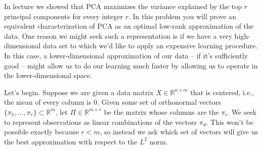 \documentclass{harvardml}
\newcommand{\R}{\mathbb{R}}
\theoremstyle{plain}
\begin{document}

\begin{problem}
In lecture we showed that PCA maximizes the variance explained by the top $r$ principal components for every integer $r$. In this problem you will prove an equivalent characterization of PCA as an optimal low-rank approximation of the data. One reason we might seek such a representation is if we have a very high-dimensional data set to which we'd like to apply an expensive learning procedure. In this case, a lower-dimensional approximation of our data \--- if it's sufficiently good \--- might allow us to do our learning much faster by allowing us to operate in the lower-dimensional space.

Let's begin. Suppose we are given a data matrix $X \in \R^{n \times m}$ that is centered, i.e., the mean of every column is 0. Given some set of orthonormal vectors $\{ \pi_1, \ldots, \pi_r\} \subset \R^m$, let $\Pi \in \R^{m \times r}$ be the matrix whose columns are the $\pi_i$. We seek to represent observations as linear combinations of the vectors $\pi_d$. This won't be possible exactly because $r < m$, so instead we ask which set of vectors will give us the best approximation with respect to the $L^2$ norm.
\end{problem}
\end{document}

